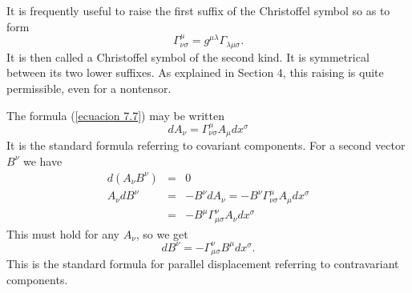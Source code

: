 It is frequently useful to raise the first suffix of the Christoffel symbol so 
as to form
\[
 \Gamma^\mu_{\nu\sigma} = g^{\mu\lambda}\Gamma_{\lambda\mu\sigma}.
\]
It is then called a Christoffel symbol of the second kind. It is symmetrical 
between its two lower suffixes. As explained in Section 4, this raising is 
quite permissible, even for a nontensor.

The formula (\ref{ecuacion 7.7}) may be written
\begin{equation}
 \label{ecuacion 7.10}
 dA_{\nu} = \Gamma^\mu_{\nu\sigma} A_\mu dx^\sigma
\end{equation}
It is the standard formula referring to covariant components. For a second 
vector $B^\nu$ we have
\[
\begin{array}{rcl}
d(A_\nu B^\nu) & = & 0 \\
A_\nu d B^\nu  & = & - B^\nu d A_\nu 
                 = - B^\nu \Gamma^\mu_{\nu\sigma} A_\mu dx^\sigma \\
               & = & - B^\mu \Gamma^\nu_{\mu\sigma} A_\nu dx^\sigma
\end{array}
\]
This must hold for any $A_\nu$, so we get
\begin{equation}
 \label{ecuacion 7.11}
 d B^\nu = - \Gamma^\nu_{\mu\sigma} B^\mu dx^\sigma.
\end{equation}
This is the standard formula for parallel displacement referring to 
contravariant components.









